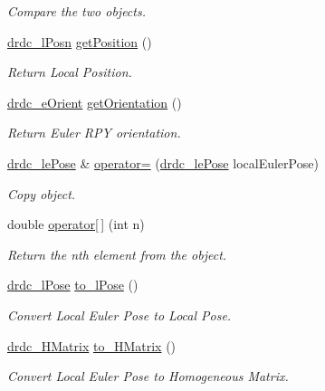 \begin{CompactItemize}
\begin{CompactList}\small\item\em Compare the two objects. \item\end{CompactList}\item 
\hyperlink{classdrdc__lPosn}{drdc\_\-lPosn} \hyperlink{classdrdc__lePose_1954d7b4ecfd2fcd17d72e9e2d56c067}{getPosition} ()
\begin{CompactList}\small\item\em Return Local Position. \item\end{CompactList}\item 
\hyperlink{classdrdc__eOrient}{drdc\_\-eOrient} \hyperlink{classdrdc__lePose_f14f53d67a4156f566c44efcdad9d03c}{getOrientation} ()
\begin{CompactList}\small\item\em Return Euler RPY orientation. \item\end{CompactList}\item 
\hyperlink{classdrdc__lePose}{drdc\_\-lePose} \& \hyperlink{classdrdc__lePose_8fb9ac828578499db06cfc2413ae5dfc}{operator=} (\hyperlink{classdrdc__lePose}{drdc\_\-lePose} localEulerPose)
\begin{CompactList}\small\item\em Copy object. \item\end{CompactList}\item 
double \hyperlink{classdrdc__lePose_faff036dc5a63cdb1d7ec0650740fbc1}{operator\mbox{[}$\,$\mbox{]}} (int n)
\begin{CompactList}\small\item\em Return the nth element from the object. \item\end{CompactList}\item 
\hyperlink{classdrdc__lPose}{drdc\_\-lPose} \hyperlink{classdrdc__lePose_06db24cb1d5e73ea14fe07ec14a2cbec}{to\_\-lPose} ()
\begin{CompactList}\small\item\em Convert Local Euler Pose to Local Pose. \item\end{CompactList}\item 
\hyperlink{classdrdc__HMatrix}{drdc\_\-HMatrix} \hyperlink{classdrdc__lePose_6d38322461e79058e87eccd77b3259b6}{to\_\-HMatrix} ()
\begin{CompactList}\small\item\em Convert Local Euler Pose to Homogeneous Matrix. \item\end{CompactList}\end{CompactItemize}
